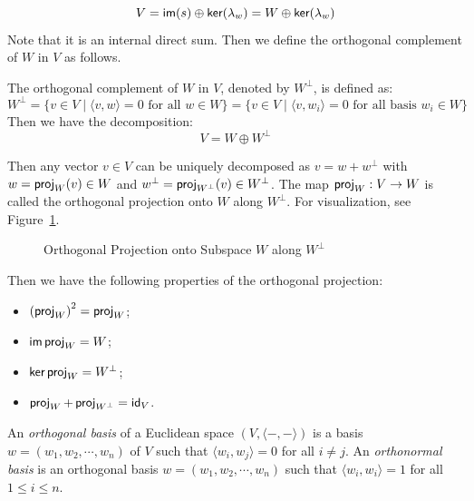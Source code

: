 \[
	V = \operatorname{\text{\normalfont\sffamily im}}(s) \oplus \operatorname{\text{\normalfont\sffamily ker}}(\lambda_w) = W \oplus \operatorname{\text{\normalfont\sffamily ker}}(\lambda_w)
\]
Note that it is an internal direct sum. Then we define the orthogonal complement of $W$ in $V$ as follows.
\begin{definition}\label{def:orthogonal_complement}
	The orthogonal complement of $W$ in $V$, denoted by $W^\perp$, is defined as:
	\[
		W^\perp = \{ v \in V \mid \langle v, w \rangle = 0 \text{ for all } w \in W \} = \{ v \in V \mid \langle v, w_i \rangle = 0 \text{ for all basis } w_i \in W \}
	\]
	Then we have the decomposition:
	\[
		V = W \oplus W^\perp
	\]
\end{definition}

Then any vector $v \in V$ can be uniquely decomposed as $v = w + w^\perp$ with $w = \operatorname{\text{\normalfont\sffamily proj}}_W(v) \in W$ and $w^\perp = \operatorname{\text{\normalfont\sffamily proj}}_{W^\perp}(v) \in W^\perp$. The map $\operatorname{\text{\normalfont\sffamily proj}}_W : V \to W$ is called the orthogonal projection onto $W$ along $W^\perp$. For visualization, see Figure~\ref{fig:orthogonal_projection}.
\begin{figure}[!ht]
	\caption{Orthogonal Projection onto Subspace $W$ along $W^\perp$}\label{fig:orthogonal_projection}
\end{figure}

Then we have the following properties of the orthogonal projection:
\begin{itemize}
	\item ${(\operatorname{\text{\normalfont\sffamily proj}}_W)}^2 = \operatorname{\text{\normalfont\sffamily proj}}_W$;
	\item $\operatorname{\text{\normalfont\sffamily im}}{\operatorname{\text{\normalfont\sffamily proj}}_W} = W$;
	\item $\operatorname{\text{\normalfont\sffamily ker}}{\operatorname{\text{\normalfont\sffamily proj}}_W} = W^\perp$;
	\item $\operatorname{\text{\normalfont\sffamily proj}}_W + \operatorname{\text{\normalfont\sffamily proj}}_{W^\perp} = \operatorname{\text{\normalfont\sffamily id}}_V$.
\end{itemize}

\begin{definition}\label{def:orthogonal_orthonormal_basis}
	An \emph{orthogonal basis} of a Euclidean space $(V, \langle -, - \rangle)$ is a basis $w = (w_1, w_2, \cdots, w_n)$ of $V$ such that $\langle w_i, w_j \rangle = 0$ for all $i \neq j$. An \emph{orthonormal basis} is an orthogonal basis $w = (w_1, w_2, \cdots, w_n)$ such that $\langle w_i, w_i \rangle = 1$ for all $1 \leq i \leq n$.
\end{definition}

